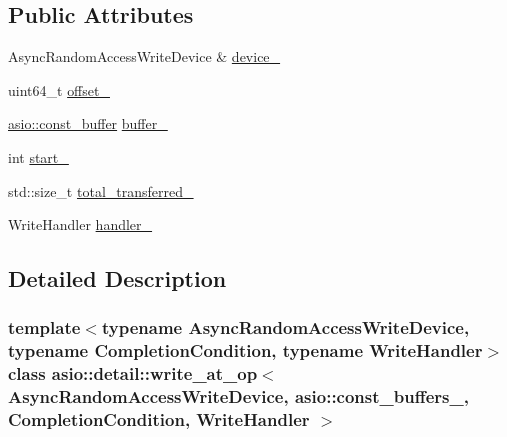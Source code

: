 \subsection*{Public Attributes}
\begin{DoxyCompactItemize}
\item 
Async\+Random\+Access\+Write\+Device \& \hyperlink{classasio_1_1detail_1_1write__at__op_3_01_async_random_access_write_device_00_01asio_1_1const__bfac42b27d8d08bd8bf66a7fd473767cd_a96bc711fd8e152cf2f15542ce3f800f7}{device\+\_\+}
\item 
uint64\+\_\+t \hyperlink{classasio_1_1detail_1_1write__at__op_3_01_async_random_access_write_device_00_01asio_1_1const__bfac42b27d8d08bd8bf66a7fd473767cd_a9e3ae7e073ba3e7429f7fbf18c795593}{offset\+\_\+}
\item 
\hyperlink{classasio_1_1const__buffer}{asio\+::const\+\_\+buffer} \hyperlink{classasio_1_1detail_1_1write__at__op_3_01_async_random_access_write_device_00_01asio_1_1const__bfac42b27d8d08bd8bf66a7fd473767cd_ab0893b3844728ec975bea2e88a1d39b7}{buffer\+\_\+}
\item 
int \hyperlink{classasio_1_1detail_1_1write__at__op_3_01_async_random_access_write_device_00_01asio_1_1const__bfac42b27d8d08bd8bf66a7fd473767cd_a4fdfffddcc3f7b0dc06311258c45f2b7}{start\+\_\+}
\item 
std\+::size\+\_\+t \hyperlink{classasio_1_1detail_1_1write__at__op_3_01_async_random_access_write_device_00_01asio_1_1const__bfac42b27d8d08bd8bf66a7fd473767cd_a61c09b928b0ed27b195329b6381577eb}{total\+\_\+transferred\+\_\+}
\item 
Write\+Handler \hyperlink{classasio_1_1detail_1_1write__at__op_3_01_async_random_access_write_device_00_01asio_1_1const__bfac42b27d8d08bd8bf66a7fd473767cd_afa760b6c053b644807af8cc304dd463f}{handler\+\_\+}
\end{DoxyCompactItemize}


\subsection{Detailed Description}
\subsubsection*{template$<$typename Async\+Random\+Access\+Write\+Device, typename Completion\+Condition, typename Write\+Handler$>$class asio\+::detail\+::write\+\_\+at\+\_\+op$<$ Async\+Random\+Access\+Write\+Device, asio\+::const\+\_\+buffers\+\_,                           Completion\+Condition, Write\+Handler $>$}



